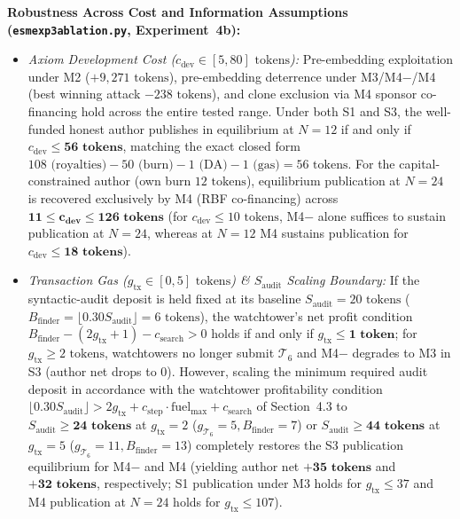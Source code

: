 \documentclass[runningheads,a4paper]{llncs}
\renewcommand{\_}{\textunderscore\allowbreak}
\begin{document}
\textbf{Robustness Across Cost and Information Assumptions (\texttt{esm\_exp3\_ablation.py}, Experiment~4b):}
\begin{itemize}
  \item \emph{Axiom Development Cost ($c_{\text{dev}} \in [5,\allowbreak 80]\text{ tokens}$):} Pre-embedding exploitation under M2 ($+9,271\text{ tokens}$), pre-embedding deterrence under M3/M4$-$/M4 (best winning attack $-238\text{ tokens}$), and clone exclusion via M4 sponsor co-financing hold across the entire tested range. Under both S1 and S3, the well-funded honest author publishes in equilibrium at $N = 12$ if and only if $c_{\text{dev}} \le \mathbf{56\text{ tokens}}$, matching the exact closed form $108\text{ (royalties)} - 50\text{ (burn)} - 1\text{ (DA)} - 1\text{ (gas)} = 56\text{ tokens}$. For the capital-constrained author (own burn $12\text{ tokens}$), equilibrium publication at $N = 24$ is recovered exclusively by M4 (RBF co-financing) across $\mathbf{11 \le c_{\text{dev}} \le 126\text{ tokens}}$ (for $c_{\text{dev}} \le 10\text{ tokens}$, M4$-$ alone suffices to sustain publication at $N = 24$, whereas at $N = 12$ M4 sustains publication for $c_{\text{dev}} \le \mathbf{18\text{ tokens}}$).
  \item \emph{Transaction Gas ($g_{\text{tx}} \in [0,\allowbreak 5]\text{ tokens}$) \& $S_{\text{audit}}$ Scaling Boundary:} If the syntactic-audit deposit is held fixed at its baseline $S_{\text{audit}} = 20\text{ tokens}$ ($B_{\text{finder}} = \lfloor 0.30 S_{\text{audit}} \rfloor = 6\text{ tokens}$), the watchtower's net profit condition $B_{\text{finder}} - (2 g_{\text{tx}} + 1) - c_{\text{search}} > 0$ holds if and only if $g_{\text{tx}} \le \mathbf{1\text{ token}}$; for $g_{\text{tx}} \ge 2\text{ tokens}$, watchtowers no longer submit $\mathcal{T}_6$ and M4$-$ degrades to M3 in S3 (author net drops to $0$). However, scaling the minimum required audit deposit in accordance with the watchtower profitability condition $\lfloor 0.30 S_{\text{audit}} \rfloor > 2 g_{\text{tx}} + c_{\text{step}}\cdot\text{fuel}_{\max} + c_{\text{search}}$ of Section~4.3 to $S_{\text{audit}} \ge \mathbf{24\text{ tokens}}$ at $g_{\text{tx}} = 2$ ($g_{\mathcal{T}_6} = 5,\allowbreak B_{\text{finder}} = 7$) or $S_{\text{audit}} \ge \mathbf{44\text{ tokens}}$ at $g_{\text{tx}} = 5$ ($g_{\mathcal{T}_6} = 11,\allowbreak B_{\text{finder}} = 13$) completely restores the S3 publication equilibrium for M4$-$ and M4 (yielding author net $\mathbf{+35\text{ tokens}}$ and $\mathbf{+32\text{ tokens}}$, respectively; S1 publication under M3 holds for $g_{\text{tx}} \le 37$ and M4 publication at $N = 24$ holds for $g_{\text{tx}} \le 107$).

\end{itemize}
\end{document}
